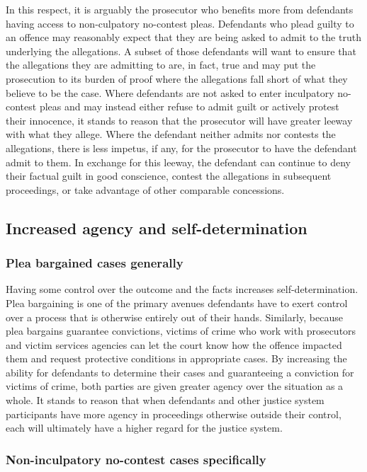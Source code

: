 In this respect, it is arguably the prosecutor who benefits more from defendants having access to non-culpatory no-contest pleas. Defendants who plead guilty to an offence may reasonably expect that they are being asked to admit to the truth underlying the allegations. A subset of those defendants will want to ensure that the allegations they are admitting to are, in fact, true and may put the prosecution to its burden of proof where the allegations fall short of what they believe to be the case. Where defendants are not asked to enter inculpatory no-contest pleas and may instead either refuse to admit guilt or actively protest their innocence, it stands to reason that the prosecutor will have greater leeway with what they allege. Where the defendant neither admits nor contests the allegations, there is less impetus, if any, for the prosecutor to have the defendant admit to them. In exchange for this leeway, the defendant can continue to deny their factual guilt in good conscience, contest the allegations in subsequent proceedings, or take advantage of other comparable concessions.

\subsection{Increased agency and self-determination}

\subsubsection{Plea bargained cases generally}

Having some control over the outcome and the facts increases self-determination. Plea bargaining is one of the primary avenues defendants have to exert control over a process that is otherwise entirely out of their hands. Similarly, because plea bargains guarantee convictions, victims of crime who work with prosecutors and victim services agencies can let the court know how the offence impacted them and request protective conditions in appropriate cases. By increasing the ability for defendants to determine their cases and guaranteeing a conviction for victims of crime, both parties are given greater agency over the situation as a whole. It stands to reason that when defendants and other justice system participants have more agency in proceedings otherwise outside their control, each will ultimately have a higher regard for the justice system.

\subsubsection{Non-inculpatory no-contest cases specifically}

